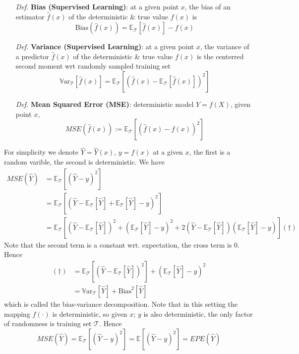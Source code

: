 \documentclass[a4paper, 11pt]{article}
\begin{document}
\begin{itemize}
	\item[\textit{Def.}] \textbf{Bias (Supervised Learning)}: at a given point $x$, the bias of an estimator $\hat{f}(x)$ of the deterministic \& true value $f(x)$ is
	$$
	\text{Bias}(\hat{f}(x))=\mathbb{E}_{\mathcal{T}}\left[\hat{f}(x)\right] - f(x)
	$$

	\item[\textit{Def.}] \textbf{Variance (Supervised Learning)}: at a given point $x$, the variance of a predictor $\hat{f}(x)$ of the  deterministic \& true value $f(x)$ is the centerred second moment wrt randomly sampled training set
	$$
	\mathrm{\mathbb{V}ar}_{\mathcal{T}}\left[\hat{f}(x)\right] = \mathbb{E}_{\mathcal{T}}\left[\left(\hat{f}(x)-\mathbb{E}_{\mathcal{T}}\left[\hat{f}(x)\right]\right)^2\right]
	$$

	\item[\textit{Def.}] \textbf{Mean Squared Error (MSE)}: deterministic model $Y = f(X)$, given point $x$,
	$$
	MSE(\hat{f}(x)) := \mathbb{E}_{\mathcal{T}}\left[\left(\hat{f}(x) - f(x)\right)^2\right]
	$$
\end{itemize}
For simplicity we denote $\hat{Y}=\hat{Y}(x)$, $y=f(x)$ at a given $x$, the first is a random varible, the second is deterministic. We have
\begin{equation}
	\begin{split}
		MSE(\hat{Y}) &= \mathbb{E}_{\mathcal{T}}\left[\left(\hat{Y} - y\right)^2\right] \\
		& = \mathbb{E}_{\mathcal{T}}\left[\left(\hat{Y} - \mathbb{E}_{\mathcal{T}}[\hat{Y}] + \mathbb{E}_{\mathcal{T}}[\hat{Y}] - y\right)^2\right] \\
		& = \mathbb{E}_{\mathcal{T}}\left[\left(\hat{Y} - \mathbb{E}_{\mathcal{T}}[\hat{Y}]\right)^2 + \left(\mathbb{E}_{\mathcal{T}}[\hat{Y}] - y\right)^2 + 2(\hat{Y} - \mathbb{E}_{\mathcal{T}}[\hat{Y}])(\mathbb{E}_{\mathcal{T}}[\hat{Y}] - y)\right] (\dag)
	\end{split}
\end{equation}
Note that the second term is a constant wrt. expectation, the cross term is 0. Hence 
\begin{equation}
	\begin{split}
		(\dag) &= \mathbb{E}_{\mathcal{T}}\left[\left(\hat{Y} - \mathbb{E}_{\mathcal{T}}[\hat{Y}]\right)^2\right] + \left(\mathbb{E}_{\mathcal{T}}[\hat{Y}] - y\right)^2 \\
		&= \mathrm{\mathbb{V}ar}_{\mathcal{T}}[\hat{Y}] + \text{Bias}^2[\hat{Y}]
	\end{split}
\end{equation}
which is called the bias-variance decomposition. Note that in this setting the mapping $f(\cdot)$ is deterministic, so given $x$; $y$ is also deterministic, the only factor of randomness is training set $\mathcal{T}$. Hence
$$
MSE(\hat{Y}) = \mathbb{E}_{\mathcal{T}}\left[\left(\hat{Y} - y\right)^2\right] = \mathbb{E}\left[(\hat{Y} - y)^2\right] = EPE(\hat{Y})
$$ 
\end{document}
